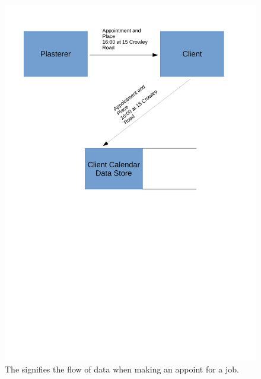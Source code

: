 \begin{figure}[H]
    \includegraphics[width=\textwidth]{./Analysis/images/AppointmentDFD.pdf}
    \caption{The signifies the flow of data when making an appoint for a job.} \label{fig:appointment_data_flow_diagram}
\end{figure}

